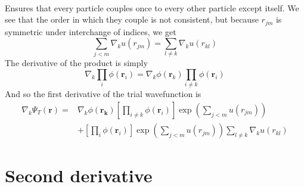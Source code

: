 \documentclass[
    a4paper, aps, twocolumn, floatfix, superscriptaddress,
    nofootinbib]{revtex4-1}
\begin{document}
\begin{appendices}
\begin{align}
\end{align}
Ensures that every particle couples once to every other particle except itself. We see that the order in which they couple is not consistent, but because $r_{jm}$ is symmetric under interchange of indices, we get 
\begin{equation}
    \sum_{j<m }\nabla_k  u(r_{jm}) = \sum_{l\neq k } \nabla_k u(r_{kl})
\end{equation}
The derivative of the product is simply 
\begin{equation}
    \nabla_k \prod_{i}\phi(\boldsymbol{r}_i) = \nabla_k \phi(\boldsymbol{r}_k) \prod_{i \neq k} \phi(\boldsymbol{r}_i)
\end{equation}
And so the first derivative of the trial wavefunction is
\begin{align}
    \nabla_k \Psi_T(\boldsymbol{r}) =& \nabla_k \phi(\boldsymbol{r_k}) \left[\prod_{i \neq k} \phi(\boldsymbol{r}_i)\right] \exp\left(\sum_{j<m} u(r_{jm})\right) \\
    &+ \left[\prod_i \phi(\boldsymbol{r}_i)\right]\exp \left(\sum_{j<m} u(r_{jm})\right) \sum_{l\neq k} \nabla_k u(r_{kl}) \nonumber
\end{align}



\section{Second derivative}


\end{appendices}
\end{document}
